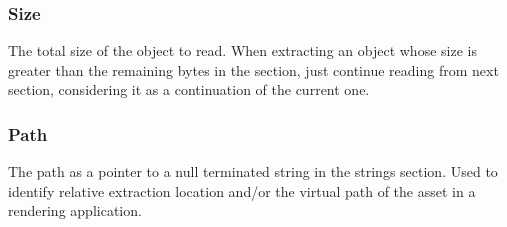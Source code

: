\subsubsection{Size}
The total size of the object to read. When extracting an object whose size is greater than the remaining bytes in the section, just continue reading from next section, considering it as a continuation of the current one.

\subsubsection{Path}
The path as a pointer to a null terminated string in the strings section. Used to identify relative extraction location and/or the virtual path of the asset in a rendering application.

